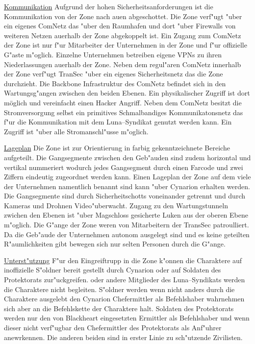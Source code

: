 \underline{Kommunikation} Aufgrund der hohen Sicherheitsanforderungen ist die Kommunikation von der Zone nach au\3en abgeschottet. Die Zone verf"ugt "uber ein eigenes ComNetz das "uber den Raumhafen und dort "uber Firewalls von weiteren Netzen au\3erhalb der Zone abgekoppelt ist. Ein Zugang zum ComNetz der Zone ist nur f"ur Mitarbeiter der Unternehmen in der Zone und f"ur offizielle G"aste m"oglich. Einzelne Unternehmen betreiben eigene VPNs zu ihren Niederlassungen au\3erhalb der Zone. Neben dem regul"aren ComNetz innerhalb der Zone verf"ugt TranSec "uber ein eigenes Sicherheitsnetz das die Zone durchzieht. Die Backbone Infrastruktur des ComNetz befindet sich in den Wartungsg"angen zwischen den beiden Ebenen. Ein physikalischer Zugriff ist dort möglich und vereinfacht einen Hacker Angriff. Neben dem ComNetz besitzt die Stromversorgung selbst ein primitives Schmalbandiges Kommunikatonsnetz das f"ur die Kommunikation mit dem Luna--Syndikat genutzt werden kann. Ein Zugriff ist "uber alle Stromanschl"usse m"oglich.

\underline{Lageplan} Die Zone ist zur Orientierung in farbig gekenntzeichnete Bereiche aufgeteilt. Die Gangsegmente zwischen den Geb"auden sind zudem horizontal und vertikal nummeriert wodurch jedes Gangsegment durch einen Farcode und zwei Ziffern eindeutig zugeordnet werden kann. Einen Lageplan der Zone auf dem viele der Unternehmen namentlich benannt sind kann "uber Cynarion erhalten werden. Die Gangsegmente sind durch Sicherheitschotts voneinander getrennt und durch Kameras und Drohnen Video"uberwacht. Zugang zu den Wartungstunneln zwichen den Ebenen ist "uber Magschloss gesicherte Luken aus der oberen Ebene m"oglich. Die G"ange der Zone weren von Mitarbeitern der TransSec patroulliert. Da die Geb"aude der Unternehmen autonom ausgelegt sind und es keine geteilten R"aumlichkeiten gibt bewegen sich nur selten Personen durch die G"ange.

\underline{Unterst"utzung} F"ur den Eingreiftrupp in die Zone k"onnen die Charaktere auf inoffizielle S"oldner bereit gestellt durch Cynarion oder auf Soldaten des Protektorats zur"uckgreifen. \xl{} oder andere Mitglieder des Luna--Syndikats werden die Charaktere nicht begleiten. S"oldner werden wenn nicht anders durch die Charaktere ausgelebt den Cynarion Chefermittler als Befehlshaber wahrnehmen sich aber an die Befehlskette der Charaktere halt. Soldaten des Protektorats werden nur den von Blackheart eingesetzten Ermittler als Befehlshaber und wenn dieser nicht verf"ugbar den Chefermittler des Protektorats als Anf"uhrer anewrkennen. Die anderen beiden sind in erster Linie zu sch"utzende Zivilisten.

